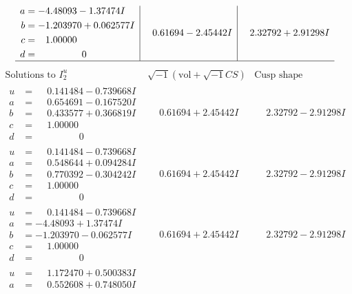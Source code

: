 \documentclass[1p]{elsarticle_modified}
\theoremstyle{definition}
\newcommand{\I}{\sqrt{-1}}
\begin{document}
$$\begin{array}{c|c|c}
\begin{aligned}
a &= -4.48093 - 1.37474 I \\
b &= -1.203970 + 0.062577 I \\
c &= \phantom{-}1.00000\phantom{ +0.000000I} \\
d &= \phantom{-0.000000 } 0\end{aligned}
 & \phantom{-}0.61694 - 2.45442 I & \phantom{-}2.32792 + 2.91298 I\\
 \hline 
 \end{array}$$\newpage$$\begin{array}{c|c|c}  
\text{Solutions to }I^u_{2}& \I (\text{vol} + \sqrt{-1}CS) & \text{Cusp shape}\\
 \hline 
\begin{aligned}
u &= \phantom{-}0.141484 - 0.739668 I \\
a &= \phantom{-}0.654691 - 0.167520 I \\
b &= \phantom{-}0.433577 + 0.366819 I \\
c &= \phantom{-}1.00000\phantom{ +0.000000I} \\
d &= \phantom{-0.000000 } 0\end{aligned}
 & \phantom{-}0.61694 + 2.45442 I & \phantom{-}2.32792 - 2.91298 I \\ \hline\begin{aligned}
u &= \phantom{-}0.141484 - 0.739668 I \\
a &= \phantom{-}0.548644 + 0.094284 I \\
b &= \phantom{-}0.770392 - 0.304242 I \\
c &= \phantom{-}1.00000\phantom{ +0.000000I} \\
d &= \phantom{-0.000000 } 0\end{aligned}
 & \phantom{-}0.61694 + 2.45442 I & \phantom{-}2.32792 - 2.91298 I \\ \hline\begin{aligned}
u &= \phantom{-}0.141484 - 0.739668 I \\
a &= -4.48093 + 1.37474 I \\
b &= -1.203970 - 0.062577 I \\
c &= \phantom{-}1.00000\phantom{ +0.000000I} \\
d &= \phantom{-0.000000 } 0\end{aligned}
 & \phantom{-}0.61694 + 2.45442 I & \phantom{-}2.32792 - 2.91298 I \\ \hline\begin{aligned}
u &= \phantom{-}1.172470 + 0.500383 I \\
a &= \phantom{-}0.552608 + 0.748050 I \\

\end{aligned}
\end{array}$$
\end{document}
